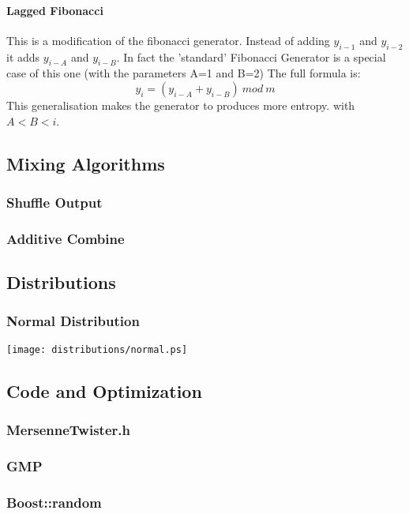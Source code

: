 \documentclass{scrartcl}
\begin{document}
\paragraph{Lagged Fibonacci}
This is a modification of the fibonacci generator.  Instead of adding $y_{i-1}$ and $y_{i-2}$ it adds $y_{i-A}$ and $y_{i-B}$. In fact the 'standard' Fibonacci Generator is a special case of this one (with the parameters A=1 and B=2)\newline
The full formula is:
\begin{equation}y_i = (y_{i-A} + y_{i-B})\:mod\:m\end{equation}
This generalisation makes the generator to produces more entropy.
with $A < B < i$.

\subsection{Mixing Algorithms}
\subsubsection{Shuffle Output}
\subsubsection{Additive Combine}
\subsection{Distributions}
\subsubsection{Normal Distribution}
\texttt{[image: distributions/normal.ps]}
\subsection{Code and Optimization}
\subsubsection{MersenneTwister.h}
\subsubsection{GMP}
\subsubsection{Boost::random}
\end{document}
